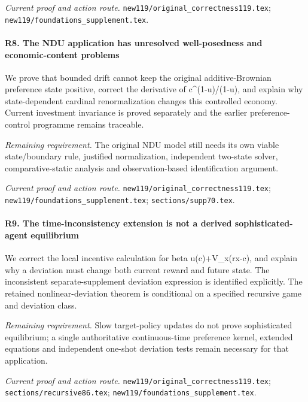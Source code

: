 \par\emph{Current proof and action route.} \nolinkurl{new119/original_correctness119.tex}; \nolinkurl{new119/foundations_supplement.tex}.

\paragraph{R8. The NDU application has unresolved well-posedness and economic-content problems}

We prove that bounded drift cannot keep the original additive-Brownian preference state positive, correct the derivative of c\textasciicircum{}(1-u)/(1-u), and explain why state-dependent cardinal renormalization changes this controlled economy. Current investment invariance is proved separately and the earlier preference-control programme remains traceable.

\par\emph{Remaining requirement.} The original NDU model still needs its own viable state/\allowbreak{}boundary rule, justified normalization, independent two-state solver, comparative-static analysis and observation-based identification argument.

\par\emph{Current proof and action route.} \nolinkurl{new119/original_correctness119.tex}; \nolinkurl{new119/foundations_supplement.tex}; \nolinkurl{sections/supp70.tex}.

\paragraph{R9. The time-inconsistency extension is not a derived sophisticated-agent equilibrium}

We correct the local incentive calculation for beta u(c)+V\_x(rx-c), and explain why a deviation must change both current reward and future state. The inconsistent separate-supplement deviation expression is identified explicitly. The retained nonlinear-deviation theorem is conditional on a specified recursive game and deviation class.

\par\emph{Remaining requirement.} Slow target-policy updates do not prove sophisticated equilibrium; a single authoritative continuous-time preference kernel, extended equations and independent one-shot deviation tests remain necessary for that application.

\par\emph{Current proof and action route.} \nolinkurl{new119/original_correctness119.tex}; \nolinkurl{sections/recursive86.tex}; \nolinkurl{new119/foundations_supplement.tex}.


